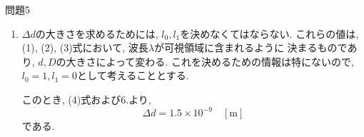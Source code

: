 \documentclass[fleqn]{jbook}
\begin{document}
\begin{answer}{問題5}{}
\begin{enumerate}
\item $\Delta \! d$の大きさを求めるためには,
 $l_0, l_1$を決めなくてはならない.
これらの値は, (1), (2), (3)式において,
波長$\lambda$が可視領域に含まれるように
決まるものであり,
 $d, D$の大きさによって変わる.
これを決めるための情報は特にないので,
 $l_0 = 1, l_1 = 0$として考えることとする.
\par
このとき, (4)式および6.より,
\[
 \Delta \! d = 1.5 \times 10^{-9} \quad [\mathrm{m}]
\]
である.
\end{enumerate}
\end{answer}
\end{document}
